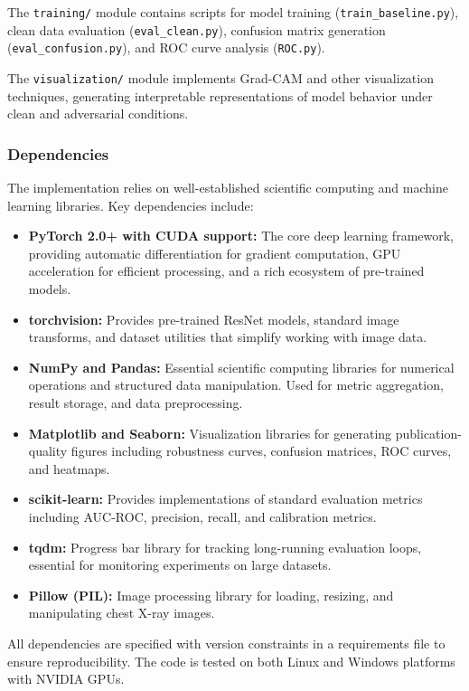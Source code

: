 \documentclass[12pt,a4paper]{article}
\begin{document}
The \texttt{training/} module contains scripts for model training (\texttt{train\_baseline.py}), clean data evaluation (\texttt{eval\_clean.py}), confusion matrix generation (\texttt{eval\_confusion.py}), and ROC curve analysis (\texttt{ROC.py}).

The \texttt{visualization/} module implements Grad-CAM and other visualization techniques, generating interpretable representations of model behavior under clean and adversarial conditions.

\subsubsection{Dependencies}

The implementation relies on well-established scientific computing and machine learning libraries. Key dependencies include:

\begin{itemize}[leftmargin=*]
    \item \textbf{PyTorch 2.0+ with CUDA support:} The core deep learning framework, providing automatic differentiation for gradient computation, GPU acceleration for efficient processing, and a rich ecosystem of pre-trained models.
    \item \textbf{torchvision:} Provides pre-trained ResNet models, standard image transforms, and dataset utilities that simplify working with image data.
    \item \textbf{NumPy and Pandas:} Essential scientific computing libraries for numerical operations and structured data manipulation. Used for metric aggregation, result storage, and data preprocessing.
    \item \textbf{Matplotlib and Seaborn:} Visualization libraries for generating publication-quality figures including robustness curves, confusion matrices, ROC curves, and heatmaps.
    \item \textbf{scikit-learn:} Provides implementations of standard evaluation metrics including AUC-ROC, precision, recall, and calibration metrics.
    \item \textbf{tqdm:} Progress bar library for tracking long-running evaluation loops, essential for monitoring experiments on large datasets.
    \item \textbf{Pillow (PIL):} Image processing library for loading, resizing, and manipulating chest X-ray images.
\end{itemize}

All dependencies are specified with version constraints in a requirements file to ensure reproducibility. The code is tested on both Linux and Windows platforms with NVIDIA GPUs.
\end{document}
